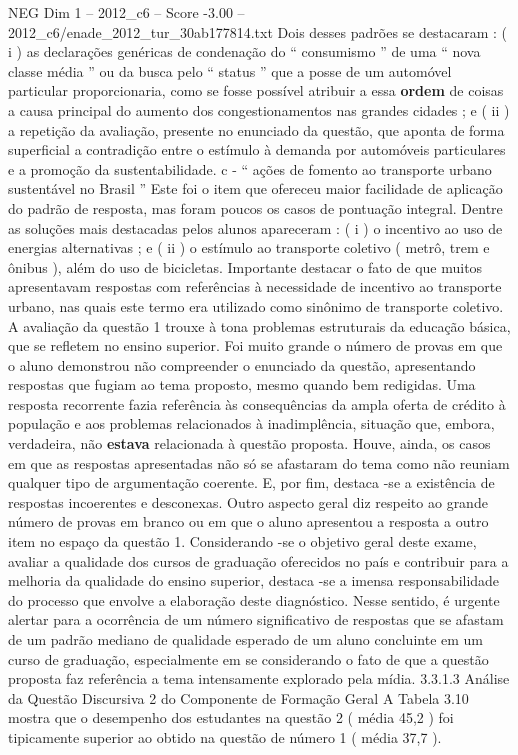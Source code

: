 \begin{textsample}{NEG Dim 1 – 2012\_c6 – Score -3.00 – 2012\_c6/enade\_2012\_tur\_30ab177814.txt}
Dois desses padrões se destacaram : ( i ) as declarações genéricas de condenação do “ consumismo ” de uma “ nova classe média ” ou da busca pelo “ status ” que a posse de um automóvel particular proporcionaria, como se fosse possível atribuir a essa \textbf{ordem} de coisas a causa principal do aumento dos congestionamentos nas grandes cidades ; e ( ii ) a repetição da avaliação, presente no enunciado da questão, que aponta de forma superficial a contradição entre o estímulo à demanda por automóveis particulares e a promoção da sustentabilidade. c - “ ações de fomento ao transporte urbano sustentável no Brasil ” Este foi o item que ofereceu maior facilidade de aplicação do padrão de resposta, mas foram poucos os casos de pontuação integral.
Dentre as soluções mais destacadas pelos alunos apareceram : ( i ) o incentivo ao uso de energias alternativas ; e ( ii ) o estímulo ao transporte coletivo ( metrô, trem e ônibus ), além do uso de bicicletas.
Importante destacar o fato de que muitos apresentavam respostas com referências à necessidade de incentivo ao transporte urbano, nas quais este termo era utilizado como sinônimo de transporte coletivo.
A avaliação da questão 1 trouxe à tona problemas estruturais da educação básica, que se refletem no ensino superior.
Foi muito grande o número de provas em que o aluno demonstrou não compreender o enunciado da questão, apresentando respostas que fugiam ao tema proposto, mesmo quando bem redigidas.
Uma resposta recorrente fazia referência às consequências da ampla oferta de crédito à população e aos problemas relacionados à inadimplência, situação que, embora, verdadeira, não \textbf{estava} relacionada à questão proposta.
Houve, ainda, os casos em que as respostas apresentadas não só se afastaram do tema como não reuniam qualquer tipo de argumentação coerente.
E, por fim, destaca -se a existência de respostas incoerentes e desconexas.
Outro aspecto geral diz respeito ao grande número de provas em branco ou em que o aluno apresentou a resposta a outro item no espaço da questão 1.
Considerando -se o objetivo geral deste exame, avaliar a qualidade dos cursos de graduação oferecidos no país e contribuir para a melhoria da qualidade do ensino superior, destaca -se a imensa responsabilidade do processo que envolve a elaboração deste diagnóstico.
Nesse sentido, é urgente alertar para a ocorrência de um número significativo de respostas que se afastam de um padrão mediano de qualidade esperado de um aluno concluinte em um curso de graduação, especialmente em se considerando o fato de que a questão proposta faz referência a tema intensamente explorado pela mídia. 3.3.1.3 Análise da Questão Discursiva 2 do Componente de Formação Geral A Tabela 3.10 mostra que o desempenho dos estudantes na questão 2 ( média 45,2 ) foi tipicamente superior ao obtido na questão de número 1 ( média 37,7 ).

\end{textsample}

